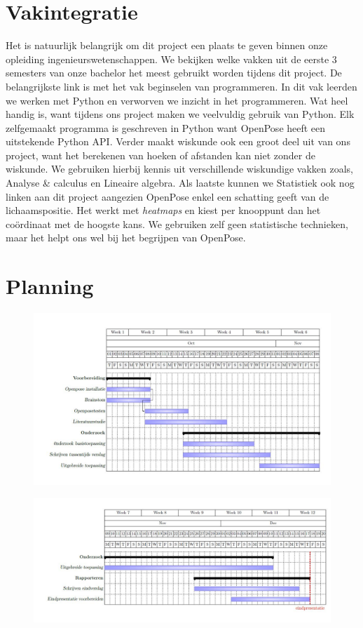 \documentclass[a4paper,twoside,kulak]{kulakreport}
\begin{document}



\chapter*{Vakintegratie}
Het is natuurlijk belangrijk om dit project een plaats te geven binnen onze opleiding ingenieurswetenschappen. We bekijken welke vakken uit de eerste 3 semesters van onze bachelor het meest gebruikt worden tijdens dit project. De belangrijkste link is met het vak beginselen van programmeren. In dit vak leerden we werken met Python en verworven we inzicht in het programmeren. Wat heel handig is, want tijdens ons project maken we veelvuldig gebruik van Python. Elk zelfgemaakt programma is geschreven in Python want OpenPose heeft een uitstekende Python API. Verder maakt wiskunde ook een groot deel uit van ons project, want het berekenen van hoeken of afstanden kan niet zonder de wiskunde. We gebruiken hierbij kennis uit verschillende wiskundige vakken zoals, Analyse \& calculus en Lineaire algebra. Als laatste kunnen we Statistiek ook nog linken aan dit project aangezien OpenPose enkel een schatting geeft van de lichaamspositie. Het werkt met \textit{heatmaps} en kiest per knooppunt dan het coördinaat met de hoogste kans. We gebruiken zelf geen statistische technieken, maar het helpt ons wel bij het begrijpen van OpenPose.

\chapter*{Planning}

\begin{landscape}
	\begin{figure}
		\includegraphics[width= 2\textwidth]{ganttchart_1}
	\end{figure}
	\begin{figure}
		\includegraphics[width= 2\textwidth]{ganttchart_2}
	\end{figure}
\end{landscape}


\end{document}
